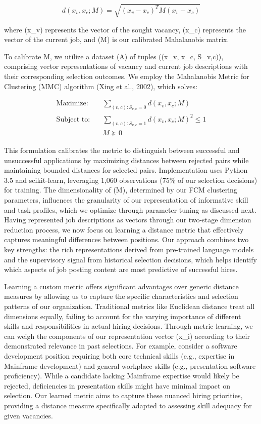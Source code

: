 \begin{equation}
d(x_v, x_c; M) = \sqrt{(x_v - x_c)^T M (x_v - x_c)}
\end{equation}

where (x_v) represents the vector of the sought vacancy, (x_c) represents the vector of the current job, and (M) is our calibrated Mahalanobis matrix.

To calibrate M, we utilize a dataset (A) of tuples ((x_v, x_c, S_{v,c})), comprising vector representations of vacancy and current job descriptions with their corresponding selection outcomes. We employ the Mahalanobis Metric for Clustering (MMC) algorithm (Xing et al., 2002), which solves:

\begin{align*}
\text{Maximize:} \quad & \sum_{(v,c): S_{v,c} = 0} d(x_v, x_c; M) \\[1em]
\text{Subject to:} \quad & \sum_{(v,c): S_{v,c} = 1} d(x_v, x_c; M)^2 \leq 1 \\
& M \succeq 0
\end{align*}

This formulation calibrates the metric to distinguish between successful and unsuccessful applications by maximizing distances between rejected pairs while maintaining bounded distances for selected pairs. Implementation uses Python 3.5 and scikit-learn, leveraging 1,060 observations (75\% of our selection decisions) for training. The dimensionality of (M), determined by our FCM clustering parameters, influences the granularity of our representation of informative skill and task profiles, which we optimize through parameter tuning as discussed next.
Having represented job descriptions as vectors through our two-stage dimension reduction process, we now focus 
on learning a distance metric that effectively captures meaningful differences between positions. Our approach 
combines two key strengths: the rich representations derived from pre-trained language models and the supervisory 
signal from historical selection decisions, which helps identify which aspects of job posting content are most 
predictive of successful hires.

Learning a custom metric offers significant advantages over generic distance measures by allowing us to 
capture the specific characteristics and selection patterns of our organization. Traditional metrics like 
Euclidean distance treat all dimensions equally, failing to account for the varying importance of different 
skills and responsibilities in actual hiring decisions. Through metric learning, we can weigh the components 
of our representation vector (x_i) according to their demonstrated relevance in past selections. For example, 
consider a software development position requiring both core technical skills (e.g., expertise in Mainframe 
development) and general workplace skills (e.g., presentation software proficiency). While a candidate lacking 
Mainframe expertise would likely be rejected, deficiencies in presentation skills might have minimal impact on 
selection. Our learned metric aims to capture these nuanced hiring priorities, providing a distance measure 
specifically adapted to assessing skill adequacy for given vacancies.


